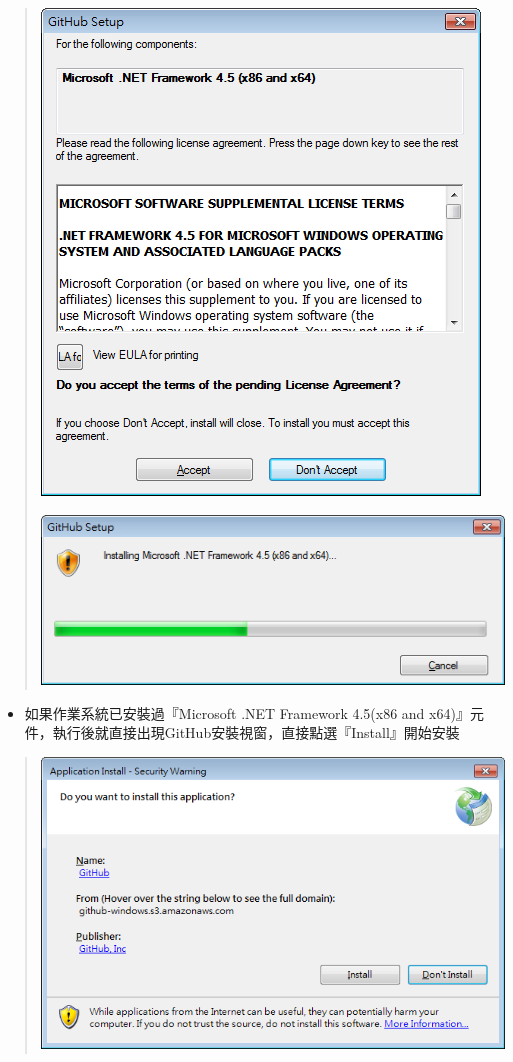 \documentclass[letterpaper,10pt,english]{sphinxmanual}
\begin{document}
\begin{quote}

\includegraphics{GitHub-Install-002.png}

\includegraphics{GitHub-Install-003.png}
\end{quote}
\begin{itemize}
\item {} 
如果作業系統已安裝過『Microsoft .NET Framework 4.5(x86 and x64)』元件，執行後就直接出現GitHub安裝視窗，直接點選『Install』開始安裝

\end{itemize}
\begin{quote}

\includegraphics{GitHub-Install-004.png}
\end{quote}
\end{document}
